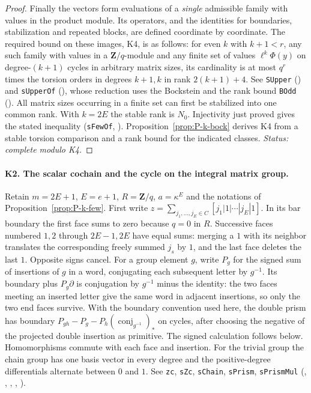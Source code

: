 \begin{proof}
Finally the vectors form evaluations of a \emph{single} admissible
family with values in the product module. Its operators, and the
identities for boundaries, stabilization and repeated blocks, are
defined coordinate by coordinate. The required bound on these images, K4, is as follows: for even $k$
with $k+1<r$, any such family with values in a $\mathbf Z/q$-module and
any finite set of values $\ell^k\Phi(y)$ on degree-$(k+1)$ cycles in
arbitrary matrix sizes, its cardinality is at most
$q^r$ times the torsion orders in degrees $k+1,k$ in rank
$2(k+1)+4$. See \nolinkurl{SUpper}
() and \nolinkurl{sUpperOf}
(), whose reduction uses the Bockstein and
the rank bound \nolinkurl{BOdd} ().
All matrix sizes occurring in a finite set can first be stabilized into
one common rank. With $k=2E$ the stable rank is $N_0$. Injectivity just
proved gives the stated inequality (\nolinkurl{sFewOf},
).
Proposition~\ref{prop:P-k-bock} derives K4 from a stable torsion comparison and a rank bound for the indicated classes. \emph{Status: complete modulo K4.}
\end{proof}

\paragraph{K2. The scalar cochain and the cycle on the integral matrix group.}\label{sec:P-r4-K2}
Retain $m=2E+1$, $E=e+1$, $R=\mathbf Z/q$, $a=\kappa^E$ and the
notations of Proposition~\ref{prop:P-k-few}. First write
$z=\sum_{j_1,\ldots,j_E\in C}[j_1|1|\cdots|j_E|1]$.
In its bar boundary the first face sums to zero because $q=0$ in $R$.
Successive faces numbered $1,2$ through $2E-1,2E$ have equal sums:
merging a $1$ with its neighbor translates the corresponding freely
summed $j_s$ by $1$, and the last face deletes the last $1$. Opposite
signs cancel. For a group element $g$, write $P_g$ for the signed sum
of insertions of $g$ in a word, conjugating each subsequent letter by
$g^{-1}$. Its boundary plus $P_g\partial$ is conjugation by $g^{-1}$
minus the identity: the two faces meeting an inserted letter give the
same word in adjacent insertions, so only the two end faces survive.
With the boundary convention used here, the double prism has boundary $P_{gh}-P_g-P_h(\operatorname{conj}_{g^{-1}})_*$ on cycles, after choosing the negative of the projected double insertion as primitive. The signed calculation follows below.
Homomorphisms commute with each face and insertion. For the trivial
group the chain group has one basis vector in every degree and the
positive-degree differentials alternate between $0$ and $1$.
See \nolinkurl{zc}, \nolinkurl{sZc}, \nolinkurl{sChain},
\nolinkurl{sPrism}, \nolinkurl{sPrismMul}
(,
, ,
, ).

